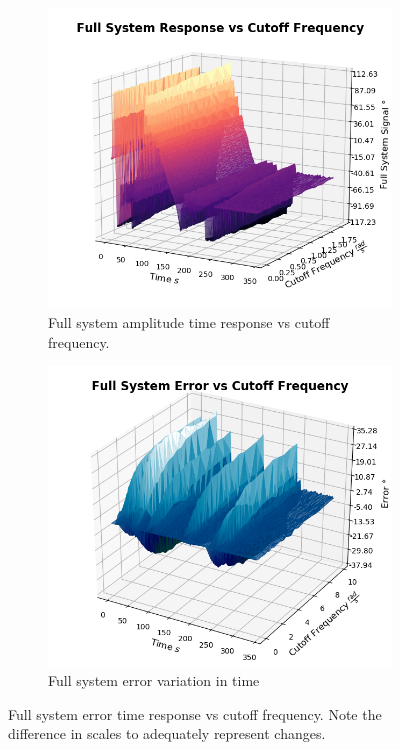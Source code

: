 \begin{figure}[H]
\centering
\begin{subfigure}{0.5\linewidth}
  \centering
  \includegraphics[width=\linewidth]{img/fullSystemCutoffFrequency.png}
  \caption{Full system amplitude time response vs cutoff frequency.}
  \label{fig:full_system_cutoff_frequency}
\end{subfigure}%
\begin{subfigure}{0.5\linewidth}
  \centering
  \includegraphics[width=\linewidth]{img/fullSystemErrorCutoffFrequency.png}
  \caption{Full system error variation in time}
  \label{fig:sub2}
\end{subfigure}
\caption{Full system error time response vs cutoff frequency. Note the difference in scales to adequately represent changes.}
\label{fig:full_system_error_cutoff_frequency}
\end{figure}

